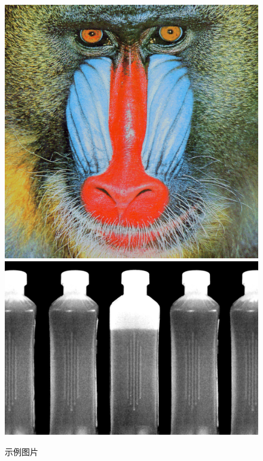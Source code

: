 \documentclass[fonset = fandol]{ctexart}
\begin{document}
\begin{figure}
	\centering
	\includegraphics[width=0.48\linewidth]{image1}
	\hfill
	\includegraphics[width=0.48\linewidth]{image2}
	\caption{示例图片}
\end{figure}
\end{document}
